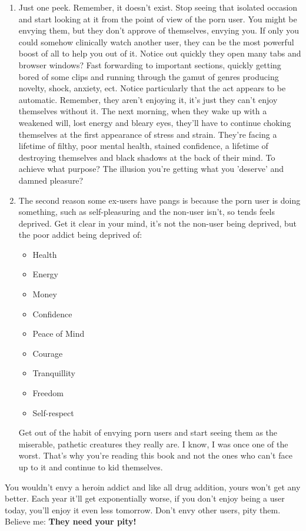 \documentclass[easypeasy.tex]{subfiles}
\begin{document}
\begin{enumerate}
  \item Just one peek. Remember, it doesn't exist. Stop seeing that isolated occasion and start looking at it from the point of view of the porn user. You might be envying them, but they don't approve of themselves, envying you. If only you could somehow clinically watch another user, they can be the most powerful boost of all to help you out of it. Notice out quickly they open many tabs and browser windows? Fast forwarding to important sections, quickly getting bored of some clips and running through the gamut of genres producing novelty, shock, anxiety, ect. Notice particularly that the act appears to be automatic. Remember, they aren't enjoying it, it's just they can't enjoy themselves without it. The next morning, when they wake up with a weakened will, lost energy and bleary eyes, they'll have to continue choking themselves at the first appearance of stress and strain. They're facing a lifetime of filthy, poor mental health, stained confidence, a lifetime of destroying themselves and black shadows at the back of their mind. To achieve what purpose? The illusion you're getting what you 'deserve' and damned pleasure?

  \item The second reason some ex-users have pangs is because the porn user is doing something, such as self-pleasuring and the non-user isn't, so tends feels deprived. Get it clear in your mind, it's not the non-user being deprived, but the poor addict being deprived of:
  \begin{itemize}
    \item Health
    \item Energy
    \item Money
    \item Confidence
    \item Peace of Mind
    \item Courage
    \item Tranquillity
    \item Freedom
    \item Self-respect
  \end{itemize}

  Get out of the habit of envying porn users and start seeing them as the miserable, pathetic creatures they really are. I know, I was once one of the worst. That's why you're reading this book and not the ones who can't face up to it and continue to kid themselves.
\end{enumerate}

  You wouldn't envy a heroin addict and like all drug addition, yours won't get any better. Each year it'll get exponentially worse, if you don't enjoy being a user today, you'll enjoy it even less tomorrow. Don't envy other users, pity them. Believe me: \textbf{They need your pity!}
\end{document}
